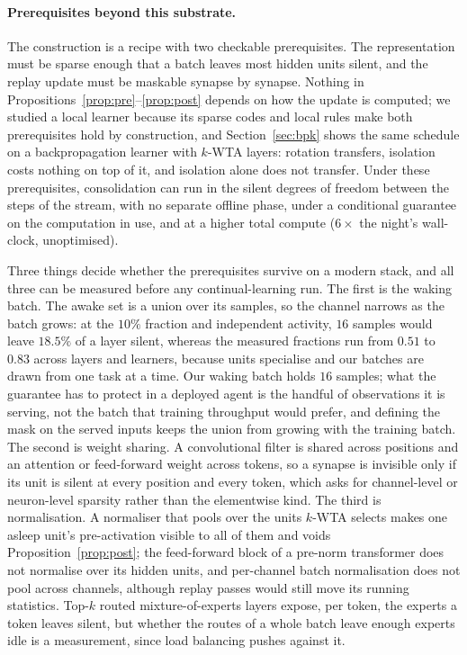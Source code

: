 \documentclass{article}
\newcommand{\kwta}{$k$-WTA}
\begin{document}
\paragraph{Prerequisites beyond this substrate.}
The construction is a recipe with two checkable prerequisites. The representation must be
sparse enough that a batch leaves most hidden units silent, and the replay update must be
maskable synapse by synapse. Nothing in Propositions~\ref{prop:pre}--\ref{prop:post}
depends on how the update is computed; we studied a local learner because its sparse codes
and local rules make both prerequisites hold by construction, and Section~\ref{sec:bpk}
shows the same schedule on a backpropagation learner with \kwta{} layers: rotation
transfers, isolation costs nothing on top of it, and isolation alone does not transfer.
Under these prerequisites, consolidation can run in the silent
degrees of freedom between the
steps of the stream, with no separate offline phase, under a conditional guarantee on the
computation in use, and at a higher total compute ($6\times$ the night's wall-clock,
unoptimised).

Three things decide whether the prerequisites survive on a modern stack, and all three can
be measured before any continual-learning run. The first is the waking batch. The awake set
is a union over its samples, so the channel narrows as the batch grows: at the $10\%$
fraction and independent activity, $16$ samples would leave $18.5\%$ of a layer silent,
whereas the measured fractions run from $0.51$ to $0.83$ across layers and learners, because
units specialise and our batches are drawn from one task at a time. Our waking batch holds $16$ samples; what the guarantee has
to protect in a deployed agent is the handful of observations it is serving, not the batch
that training throughput would prefer, and defining the mask on the served inputs keeps the
union from growing with the training batch. The second is weight sharing. A convolutional
filter is shared across positions and an attention or feed-forward weight across tokens, so
a synapse is invisible only if its unit is silent at every position and every token, which
asks for channel-level or neuron-level sparsity rather than the elementwise kind. The third
is normalisation. A normaliser that pools over the units \kwta{} selects makes one asleep
unit's pre-activation visible to all of them and voids
Proposition~\ref{prop:post}; the feed-forward block of a pre-norm transformer does not
normalise over its hidden units, and per-channel batch normalisation does not pool across
channels, although replay passes would still move its running statistics. Top-$k$ routed
mixture-of-experts layers expose, per token, the experts a token leaves silent, but whether
the routes of a whole batch leave enough experts idle is a measurement, since load balancing
pushes against it.
\end{document}
